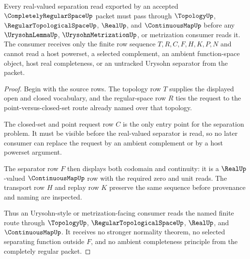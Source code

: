 \begin{theorem}
\label{thm:completely-regular-space-real-valued-separation-window}
Every real-valued separation read exported by an accepted $\CompletelyRegularSpaceUp$ packet must pass through $\TopologyUp$, $\RegularTopologicalSpaceUp$, $\RealUp$, and $\ContinuousMapUp$ before any $\UrysohnLemmaUp$, $\UrysohnMetrizationUp$, or metrization consumer reads it. The consumer receives only the finite row sequence $T,R,C,F,H,K,P,N$ and cannot read a host powerset, a selected complement, an ambient function-space object, host real completeness, or an untracked Urysohn separator from the packet.
\end{theorem}
\begin{proof}
Begin with the source rows. The topology row $T$ supplies the displayed open and closed vocabulary, and the regular-space row $R$ ties the request to the point-versus-closed-set route already named over that topology.

The closed-set and point request row $C$ is the only entry point for the separation problem. It must be visible before the real-valued separator is read, so no later consumer can replace the request by an ambient complement or by a host powerset argument.

The separator row $F$ then displays both codomain and continuity: it is a $\RealUp$-valued $\ContinuousMapUp$ row with the required zero and unit reads. The transport row $H$ and replay row $K$ preserve the same sequence before provenance and naming are inspected.

Thus an Urysohn-style or metrization-facing consumer reads the named finite route through $\TopologyUp$, $\RegularTopologicalSpaceUp$, $\RealUp$, and $\ContinuousMapUp$. It receives no stronger normality theorem, no selected separating function outside $F$, and no ambient completeness principle from the completely regular packet.
\end{proof}

